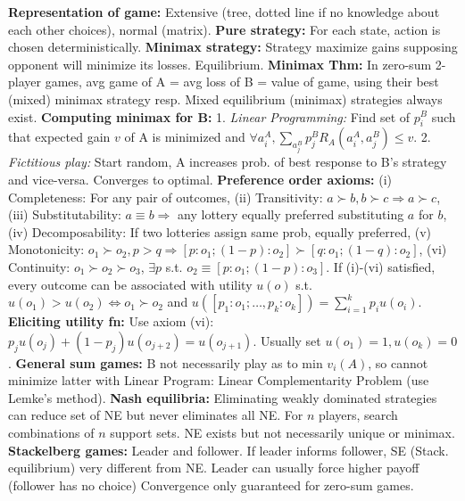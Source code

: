 \documentclass{article}
\newcommand{\disadv}[1]{{\color{red} #1}}
\newcommand{\adv}[1]{{\color{green!60!blue} #1}}
\begin{document}
\begin{multicols*}{4}
\textbf{Representation of game:} Extensive (tree, dotted line if no knowledge about each other choices), normal (matrix). \textbf{Pure strategy:} For each state, action is chosen deterministically. \textbf{Minimax strategy:} Strategy maximize gains supposing opponent will minimize its losses. \adv{Equilibrium}. \textbf{Minimax Thm:} In zero-sum 2-player games, avg game of A = avg loss of B = value of game, using their best (mixed) minimax strategy resp. \adv{Mixed equilibrium (minimax) strategies always exist}. \textbf{Computing minimax for B:} 1. \textit{Linear Programming:} Find set of $p_i^B$ such that expected gain $v$ of A is minimized and $\forall a_i^A, \sum_{a_j^B} p_j^B R_A(a_i^A, a_j^B) \leq v$. 2. \textit{Fictitious play:} Start random, A increases prob. of best response to B's strategy and vice-versa. \adv{Converges to optimal}. \textbf{Preference order axioms: }(i) Completeness: For any pair of outcomes, (ii) Transitivity: $a\succ b,b\succ c\Rightarrow a\succ c$, (iii) Substitutability: $a \equiv b \Rightarrow$ any lottery equally preferred substituting $a$ for $b$, (iv) Decomposability: If two lotteries assign same prob, equally preferred, (v) Monotonicity: $o_1\succ o_2,p>q\Rightarrow[p:o_1;(1-p):o_2]\succ [q:o_1;(1-q):o_2]$, (vi) Continuity: $o_1\succ o_2\succ o_3 $, $\exists p$ s.t. $o_2\equiv [p:o_1;(1-p):o_3]$. If (i)-(vi) satisfied, every outcome can be associated with utility $u(o)$ s.t. $u(o_1)>u(o_2)\Leftrightarrow o_1 \succ o_2$ and $u([p_1:o_1;\dots,p_k:o_k])=\sum_{i=1}^k p_i u(o_i)$. \textbf{Eliciting utility fn:} Use axiom (vi): $p_j u(o_j) +(1-p_j)u(o_{j+2})=u(o_{j+1})$. Usually set $u(o_1)=1,u(o_k)=0$. \textbf{General sum games: }B not necessarily play as to min $v_i(A)$, so cannot minimize latter with Linear Program: Linear Complementarity Problem (use Lemke's method). \textbf{Nash equilibria: }Eliminating weakly dominated strategies \disadv{can reduce set of NE} \adv{but never eliminates all NE}. For $n$ players, search combinations of $n$ support sets. NE exists but not necessarily unique or minimax. \textbf{Stackelberg games: }Leader and follower. If leader informs follower, SE (Stack. equilibrium) very different from NE. Leader can usually force higher payoff (follower has no choice) \disadv{Convergence only guaranteed for zero-sum games}.


\end{multicols*}
\end{document}
